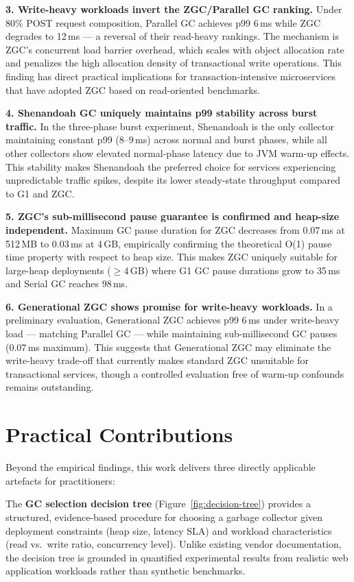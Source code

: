 \textbf{3. Write-heavy workloads invert the ZGC/Parallel GC ranking.} Under 80\% POST request composition, Parallel GC achieves p99 6\,ms while ZGC degrades to 12\,ms --- a reversal of their read-heavy rankings. The mechanism is ZGC's concurrent load barrier overhead, which scales with object allocation rate and penalizes the high allocation density of transactional write operations. This finding has direct practical implications for transaction-intensive microservices that have adopted ZGC based on read-oriented benchmarks.

\textbf{4. Shenandoah GC uniquely maintains p99 stability across burst traffic.} In the three-phase burst experiment, Shenandoah is the only collector maintaining constant p99 (8--9\,ms) across normal and burst phases, while all other collectors show elevated normal-phase latency due to JVM warm-up effects. This stability makes Shenandoah the preferred choice for services experiencing unpredictable traffic spikes, despite its lower steady-state throughput compared to G1 and ZGC.

\textbf{5. ZGC's sub-millisecond pause guarantee is confirmed and heap-size independent.} Maximum GC pause duration for ZGC decreases from 0.07\,ms at 512\,MB to 0.03\,ms at 4\,GB, empirically confirming the theoretical O(1) pause time property with respect to heap size. This makes ZGC uniquely suitable for large-heap deployments ($\geq$4\,GB) where G1 GC pause durations grow to 35\,ms and Serial GC reaches 98\,ms.

\textbf{6. Generational ZGC shows promise for write-heavy workloads.} In a preliminary evaluation, Generational ZGC achieves p99 6\,ms under write-heavy load --- matching Parallel GC --- while maintaining sub-millisecond GC pauses (0.07\,ms maximum). This suggests that Generational ZGC may eliminate the write-heavy trade-off that currently makes standard ZGC unsuitable for transactional services, though a controlled evaluation free of warm-up confounds remains outstanding.

\section*{Practical Contributions}

Beyond the empirical findings, this work delivers three directly applicable artefacts for practitioners:

The \textbf{GC selection decision tree} (Figure~\ref{fig:decision-tree}) provides a structured, evidence-based procedure for choosing a garbage collector given deployment constraints (heap size, latency SLA) and workload characteristics (read vs.\ write ratio, concurrency level). Unlike existing vendor documentation, the decision tree is grounded in quantified experimental results from realistic web application workloads rather than synthetic benchmarks.

